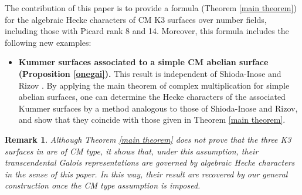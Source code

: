 \documentclass[reqno,a4paper,11pt]{amsart}
\newtheorem{rmk}[dfn]{Remark}
\theoremstyle{definition}
\theoremstyle{definition}
\begin{document}
\noindent \indent The contribution of this paper is to provide a formula (Theorem \ref{main theorem}) for the algebraic Hecke characters of  CM K3 surfaces over number fields, including those with Picard rank 8 and 14. Moreover, this formula includes the following new examples:
\begin{itemize}
    \item {\textbf{Kummer surfaces associated to a simple CM abelian surface (Proposition \ref{onegai}).}} This result is independent of Shioda-Inose \cite{si} and Rizov \cite{Rizov10}. By applying the main theorem of complex multiplication for simple abelian surfaces, one can determine the Hecke characters of the associated Kummer surfaces by a method analogous to those of Shioda-Inose and Rizov, and show that they coincide with those given in Theorem \ref{main theorem}.
\end{itemize}
\begin{rmk}
    Although Theorem \ref{main theorem} does not prove that the three K3 surfaces in \cite{costa} are of CM type, it shows that, under this assumption, their transcendental Galois representations are governed by algebraic Hecke characters in the sense of this paper. In this way, their result \cite[Theorem 1.2(a)]{costa}are recovered by our general construction once the CM type assumption is imposed. 
\end{rmk}
\end{document}
